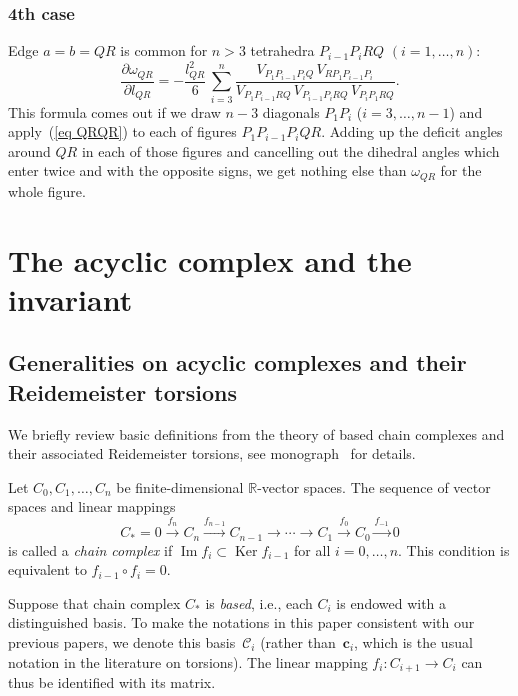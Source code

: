 \documentclass[11pt]{article}
\DeclareMathOperator{\Ima}{Im}
\DeclareMathOperator{\Ker}{Ker}
\begin{document}
\subsubsection*{4th case}
Edge $a=b=QR$ is common for $n > 3$ tetrahedra $P_{i-1}P_iRQ$ $(i = 1,\ldots,n)$:
\begin{equation}
\frac{\partial \omega_{QR}}{\partial l_{QR}} = -\frac {l_{QR}^2}{6}\, \sum\limits_{i=3}^n
\frac {V_{P_1P_{i-1}P_iQ}\,V_{RP_1P_{i-1}P_i}}{V_{P_1P_{i-1}RQ}\,V_{P_{i-1}P_iRQ}\,V_{P_iP_1RQ}}.
\label{eq QRQRn}
\end{equation}
This formula comes out if we draw $n-3$ diagonals $P_1P_i$ ($i = 3,\ldots,n-1$) and apply~(\ref{eq QRQR}) to each of f\/igures $P_1P_{i-1}P_iQR$. Adding up the def\/icit angles around $QR$ in each of those f\/igures and cancelling out the dihedral angles which enter twice and with the opposite signs, we get nothing else than $\omega_{QR}$ for the whole f\/igure.


\section{The acyclic complex and the invariant}
\label{sec_acyclic_general}

\subsection{Generalities on acyclic complexes and their Reidemeister torsions}

We brief\/ly review basic def\/initions from the theory of based chain complexes and their associated Reidemeister torsions, see monograph~\cite{Turaev:2001} for details.

\begin{definition}
\label{dfn:cmplx}
Let $C_0, C_1, \ldots , C_n$ be f\/inite-dimensional $\mathbb R$-vector spaces. The sequence of vector spaces and linear mappings
\begin{equation}
\label{eq:cmplx}
C_* = 0 \xrightarrow{f_n} C_n \xrightarrow{f_{n-1}} C_{n-1} \xrightarrow{} \cdots \xrightarrow{} C_1 \xrightarrow{f_0} C_0 \xrightarrow{f_{-1}} 0
\end{equation}
is called a \emph{chain complex} if $\Ima f_i \subset \Ker f_{i-1}$ for all $i = 0, \ldots, n$. This condition is equivalent to $f_{i-1} \circ f_i = 0$.
\end{definition}

Suppose that chain complex $C_*$ is \emph{based}, i.e., each $C_i$ is endowed with a distinguished basis. To make the notations in this paper consistent with our previous papers, we denote this basis~$\mathcal C_i$ (rather than~$\mathbf c_i$, which is the usual notation in the literature on torsions). The linear mapping $f_i \colon C_{i + 1} \to C_i$ can thus be identif\/ied with its matrix.
\end{document}
